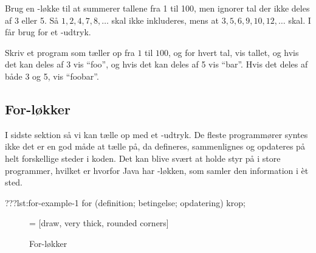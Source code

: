 		\begin{exercise}
            Brug en -løkke til at summerer tallene
            fra 1 til 100, men ignorer tal der ikke deles af 3 eller
            5. Så \(1, 2, 4, 7, 8, \dots\) skal ikke inkluderes, mens
            at \(3, 5, 6, 9, 10, 12, \dots\) skal. I får brug for et
            -udtryk.
		\end{exercise}

		\begin{exercise}
            Skriv et program som tæller op fra \(1\) til \(100\), og
            for hvert tal, vis tallet, og hvis det kan deles af 3 vis
            ``foo'', og hvis det kan deles af 5 vis ``bar''. Hvis det
            deles af både 3 og 5, vis ``foobar''.
		\end{exercise}

	\subsection{For-løkker}

		I sidste sektion så vi kan tælle op med et -udtryk.
        De fleste programmører syntes ikke det er en god måde at tælle
        på, da  defineres, sammenlignes og opdateres på
        helt forskellige steder i koden.  Det kan blive svært at holde
        styr på i store programmer, hvilket er hvorfor Java har
        -løkken, som samler den information i
		èt sted.

		\begin{JavaCode}{???}{lst:for-example-1}
			for (definition; betingelse; opdatering) {
				krop;
			}
		\end{JavaCode}

        \begin{figure}
        \center
         = [draw, very thick, rounded corners]
        \caption{For-løkker}
        \label{fig:for-loop-illustrated}
        \end{figure}

